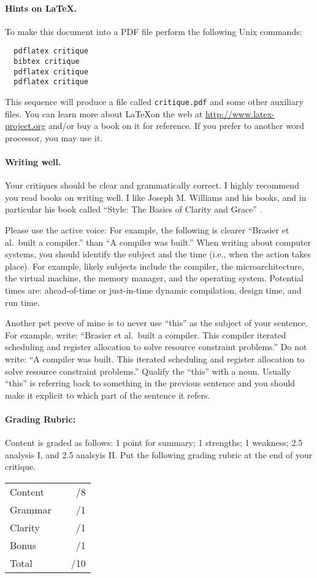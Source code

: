 \documentclass[12pt]{article}
\begin{document}
\paragraph{Hints on \LaTeX.}
To make this document into a PDF file perform the following Unix commands:
\begin{verbatim}
  pdflatex critique
  bibtex critique
  pdflatex critique
  pdflatex critique
\end{verbatim}

\noindent This sequence will produce a file called \verb|critique.pdf| and
some other auxiliary files.  You can learn more about \LaTeX on the web at
\url{http://www.latex-project.org} and/or buy a book on it for reference.  If
you prefer to another word processor, you may use it.

\paragraph{Writing well.}
Your critiques should be clear and grammatically correct.  I highly recommend
you read books on writing well. I like Joseph M. Williams and his books, and
in particular his book called ``Style: The Basics of Clarity and Grace''
\cite{Williams:05}.

Please use the active voice: For example, the following is clearer ``Brasier
et al.\ built a compiler.'' than ``A compiler was built.''  When writing about
computer systems, you should identify the subject and the time (i.e., when the
action takes place).  For example, likely subjects include the compiler, the
microarchitecture, the virtual machine, the memory manager, and the operating
system.  Potential times are: ahead-of-time or just-in-time dynamic
compilation, design time, and run time.

Another pet peeve of mine is to never use ``this'' as the subject of your
sentence.  For example, write: ``Brasier et al.\ built a compiler.  This
compiler iterated scheduling and register allocation to solve resource
constraint problems.'' Do not write: ``A compiler was built. This iterated
scheduling and register allocation to solve resource constraint problems.''
Qualify the ``this'' with a noun.  Usually ``this'' is referring back to
something in the previous sentence and you should make it explicit to which
part of the sentence it refers.



\newpage
\paragraph{Grading Rubric:} Content is graded as follows: 1 point for summary;
1 strengths; 1 weakness; 2.5 analysis I, and 2.5 analsyis II. Put the
following grading
rubric at the end of your critique.\\
\begin{tabular}{lcr}
  Content & & /8 \\ 
  Grammar & & /1 \\
  Clarity & & /1 \\
  Bonus & & /1 \\ \hline
  Total & & /10 \\
\end{tabular}
\end{document}
